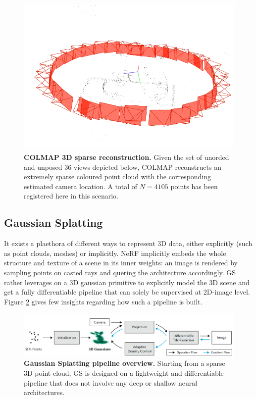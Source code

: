 \begin{figure}[htb!]
    \center
  \includegraphics[height=8cm]{images/gaussiansplatting/colmap_sparsePC.png}
  \caption{\textbf{COLMAP 3D sparse reconstruction.} Given the set of unorded and unposed 36 views depicted below, COLMAP reconstructs an extremely sparse coloured point cloud with the corresponding estimated camera location. A total of $N=4105$ points has been registered here in this scenario.}
  \label{fig:gs-sfm}
\end{figure}


\subsection{Gaussian Splatting}
\label{subsec:gs-gs}

It exists a plaethora of different ways to represent 3D data, either explicitly (such as point clouds, meshes) or implicitly. \ac{NeRF} implicitly embeds the whole structure and texture of a scene in its inner weights: an image is rendered by sampling points on casted rays and quering the architecture accordingly. \ac{GS} rather leverages on a 3D gaussian primitive to explicitly model the 3D scene and get a fully differentiable pipeline that can solely be supervised at 2D-image level. Figure \ref{fig:gs-overview} gives few insights regarding how such a pipeline is built.  

\begin{figure}[htb!]
    \center
  \includegraphics[width=\linewidth]{images/gaussiansplatting/overview-pipelineGS.png}
  \caption{\textbf{Gaussian Splatting pipeline overview.} Starting from a sparse 3D point cloud, \ac{GS} is designed on a lightweight and differentiable pipeline that does not involve any deep or shallow neural architectures.}
  \label{fig:gs-overview}
\end{figure}


